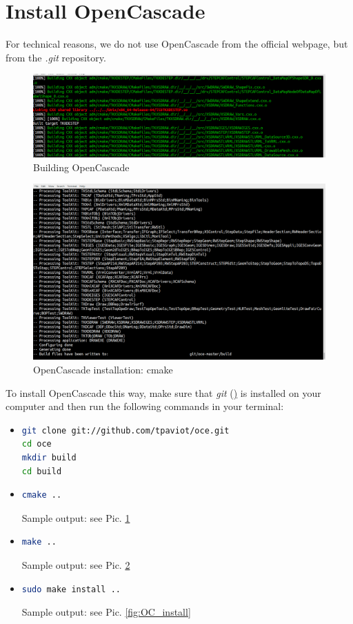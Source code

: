 \documentclass[11pt,a4paper,article,bibtotoc,idxtotoc,headsepline,footsepline,footexclude,DIV13,oneside]{scrbook}
\begin{document}
\section{Install OpenCascade}
For technical reasons, we do not use OpenCascade from the official webpage, but from the \textit{.git} repository. 
\begin{figure}
\centering
\includegraphics[scale=0.3]{img/OC_Build5_cut.png}
\caption{Building OpenCascade}
\label{fig:OC_build}
\end{figure}
\begin{figure}
\centering
\includegraphics[scale=0.3]{img/OC_CMake2.png}
\caption{OpenCascade installation: cmake}
\label{fig:OC_cmake}
\end{figure}
To install OpenCascade this way, make sure that \textit{git} (\href{https://git-scm.com/}) is installed on your computer and then run the following commands in your terminal:
\begin{itemize}
\item \begin{lstlisting}[language=bash]
git clone git://github.com/tpaviot/oce.git
cd oce
mkdir build
cd build
\end{lstlisting}
	
\item 
\begin{lstlisting}[language=bash]
cmake .. 
\end{lstlisting}	
Sample output: see Pic. \ref{fig:OC_build}
\item 
\begin{lstlisting}[language=bash]
make .. 
\end{lstlisting}	
Sample output: see Pic. \ref{fig:OC_cmake}
\item 
\begin{lstlisting}[language=bash]
sudo make install .. 
\end{lstlisting}	
Sample output: see Pic. \ref{fig:OC_install}
\end{itemize}
\end{document}
